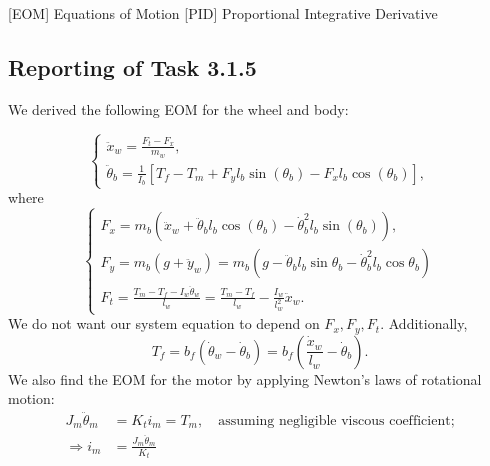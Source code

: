 \documentclass[11pt]{article} %
\begin{document}
\begin{acronym}[TDMA]
		[EOM]	{Equations of Motion}
		[PID]	{Proportional Integrative Derivative}
\end{acronym}

\subsection*{Reporting of Task 3.1.5}
We derived the following \ac{EOM} for the wheel and body:

\begin{equation}\label{eq:system-init}
  \begin{cases}
    \ddot{x}_w = \frac{F_t - F_x}{m_w}, \\[1em]
    \ddot{\theta}_b =
    \frac{1}{I_b}\left[
      T_f
      - T_m
      + F_y l_b \sin(\theta_b)
      - F_x l_b \cos(\theta_b)
    \right],
  \end{cases}
\end{equation}
where
\begin{equation}\label{eq:F_xyt}
  \begin{cases}
    F_x = m_b\left(
      \ddot{x}_w
      + \ddot{\theta}_b l_b \cos(\theta_b)
      - \dot{\theta}^2_b l_b \sin(\theta_b)
    \right), \\[1em]
    F_y = m_b (g + \ddot{y}_w)
    = m_b (g - \ddot{\theta}_b l_b \sin\theta_b - \dot{\theta}^2_b l_b \cos\theta_b)
    \\[1em]
    F_t = \frac{T_m - T_f - I_w \ddot{\theta}_w}{l_w} = \frac{T_m - T_f}{l_w} - \frac{I_w}{l^2_w} \ddot{x}_w.
  \end{cases}
\end{equation}
We do not want our system equation to depend on $F_x, F_y, F_t$.
Additionally,
\begin{equation}\label{eq:T_f}
T_f = b_f\left(
\dot{\theta}_w - \dot{\theta}_b
\right) =
b_f\left(
\frac{\dot{x}_w}{l_w} - \dot{\theta}_b
\right).
\end{equation}
We also find the \ac{EOM} for the motor by applying Newton's laws of rotational motion:
\begin{align}
  J_m \ddot{\theta}_m &= K_t i_m = T_m, \quad \text{assuming negligible viscous coefficient;}\nonumber \\
  \Rightarrow i_m &= \frac{J_m \ddot{\theta}_m}{K_t}\label{eq:motor/newton}
\end{align}
\end{document}
